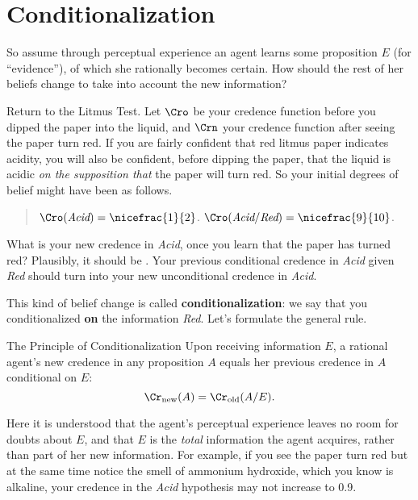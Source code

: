 \section{Conditionalization}\label{sec:conditionalization}

So assume through perceptual experience an agent learns some
proposition $E$ (for ``evidence''), of which she rationally becomes
certain. How should the rest of her beliefs change to take into
account the new information?

Return to the Litmus Test. Let $\Cro$ be your credence function before
you dipped the paper into the liquid, and $\Crn$ your credence
function after seeing the paper turn red. If you are fairly confident
that red litmus paper indicates acidity, you will also be confident,
before dipping the paper, that the liquid is acidic \emph{on the
  supposition that} the paper will turn red. So your initial degrees
of belief might have been as follows.

\begin{quote}
$\Cro(\emph{Acid}) = \nicefrac{1}{2}$.\newline
$\Cro(\emph{Acid}/\emph{Red}) = \nicefrac{9}{10}$.
\end{quote}

What is your new credence in \emph{Acid}, once you learn that the
paper has turned red? Plausibly, it should be . Your
previous conditional credence in \emph{Acid} given \emph{Red} should
turn into your new unconditional credence in \emph{Acid}.

This kind of belief change is called \textbf{conditionalization}: we
say that you conditionalized \textbf{on} the information
\emph{Red}. Let's formulate the general rule.

\begin{genericthm}{The Principle of Conditionalization}
  Upon receiving information $E$, a rational agent's new credence
  in any proposition $A$ equals her previous credence in $A$
  conditional on $E$: 
  \[
    \Cr_\text{new}(A) = \Cr_\text{old}(A/E).
  \]
\end{genericthm}
%
Here it is understood that the agent's perceptual experience leaves no
room for doubts about $E$, and that $E$ is the \emph{total}
information the agent acquires, rather than part of her new
information. For example, if you see the paper turn red but at the
same time notice the smell of ammonium hydroxide, which you know is
alkaline, your credence in the \emph{Acid} hypothesis may not
increase to 0.9.

